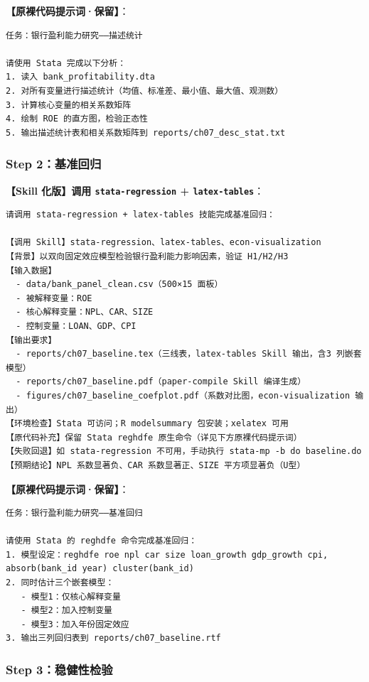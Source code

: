 \textbf{【原裸代码提示词·保留】}：

\begin{lstlisting}
任务：银行盈利能力研究——描述统计

请使用 Stata 完成以下分析：
1. 读入 bank_profitability.dta
2. 对所有变量进行描述统计（均值、标准差、最小值、最大值、观测数）
3. 计算核心变量的相关系数矩阵
4. 绘制 ROE 的直方图，检验正态性
5. 输出描述统计表和相关系数矩阵到 reports/ch07_desc_stat.txt
\end{lstlisting}

\subsubsection{Step 2：基准回归}

\textbf{【Skill 化版】调用 \texttt{stata-regression} + \texttt{latex-tables}}：

\begin{lstlisting}
请调用 stata-regression + latex-tables 技能完成基准回归：

【调用 Skill】stata-regression、latex-tables、econ-visualization
【背景】以双向固定效应模型检验银行盈利能力影响因素，验证 H1/H2/H3
【输入数据】
  - data/bank_panel_clean.csv（500×15 面板）
  - 被解释变量：ROE
  - 核心解释变量：NPL、CAR、SIZE
  - 控制变量：LOAN、GDP、CPI
【输出要求】
  - reports/ch07_baseline.tex（三线表，latex-tables Skill 输出，含3 列嵌套模型）
  - reports/ch07_baseline.pdf（paper-compile Skill 编译生成）
  - figures/ch07_baseline_coefplot.pdf（系数对比图，econ-visualization 输出）
【环境检查】Stata 可访问；R modelsummary 包安装；xelatex 可用
【原代码补充】保留 Stata reghdfe 原生命令（详见下方原裸代码提示词）
【失败回退】如 stata-regression 不可用，手动执行 stata-mp -b do baseline.do
【预期结论】NPL 系数显著负、CAR 系数显著正、SIZE 平方项显著负（U型）
\end{lstlisting}

\textbf{【原裸代码提示词·保留】}：

\begin{lstlisting}
任务：银行盈利能力研究——基准回归

请使用 Stata 的 reghdfe 命令完成基准回归：
1. 模型设定：reghdfe roe npl car size loan_growth gdp_growth cpi, absorb(bank_id year) cluster(bank_id)
2. 同时估计三个嵌套模型：
   - 模型1：仅核心解释变量
   - 模型2：加入控制变量
   - 模型3：加入年份固定效应
3. 输出三列回归表到 reports/ch07_baseline.rtf
\end{lstlisting}

\subsubsection{Step 3：稳健性检验}


